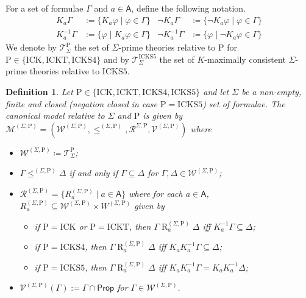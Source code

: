 \documentclass{myifcolog}
\newcommand{\K}{K}
\newcommand\Prop {\mathsf{Prop}}
\newcommand\A{\mathsf{A}}
\newcommand{\agi}{a}
\newcommand{\fw}{\mathcal{M}}
\newcommand{\Rel}{\mathrel{R}}
\newcommand{\W}{\mathcal{W}}
\newcommand{\rel}{\mathcal{R}}
\newcommand{\V}{\mathcal{V}}
\newcommand{\hick}{\mathrm{ICK}}
\newcommand{\hickt}{\mathrm{ICKT}}
\newcommand{\hicks}{\mathrm{ICKS4}}
\newcommand{\hickss}{\mathrm{ICKS5}}
\newcommand{\hickp}{\mathrm{P}}
\newtheorem{definition}[theorem]{Definition}
\numberwithin{theorem}{section}
\begin{document}
For a set of formulae $\Gamma$ and $\agi \in \A$, define the following notation.
\begin{align*}
        \K_\agi \Gamma & := \{ \K_\agi \varphi \mid \varphi \in \Gamma \} &
         \neg \K_\agi \Gamma & \coloneqq \{\neg \K_\agi \varphi \mid \varphi \in \Gamma\} \\
        \K_\agi^{-1} \Gamma & := \{\varphi \mid \K_\agi \varphi \in \Gamma\} &
         \neg \K_\agi^{-1} \Gamma & \coloneqq \{\varphi \mid \neg \K_\agi \varphi \in \Gamma\}
\end{align*}
We denote by $\mathcal{T}_\Sigma^\mathrm{P}$ the set of $\Sigma$-prime theories relative to $\mathrm{P}$ for $\hickp \in \{\hick, \hickt, \hicks\}$ and by $\mathcal{T}_\Sigma^\hickss$ the set of $\K$-maximally consistent $\Sigma$-prime theories relative to $\hickss$.

\begin{definition}
    Let $\hickp \in \{\hick, \hickt, \hicks, \hickss\}$ and let $\Sigma$ be a non-empty, finite and closed (negation closed in case $\hickp = \hickss$) set of formulae. The \emph{canonical model} relative to $\Sigma$ and $\hickp$ is given by $\fw^{(\Sigma, \mathrm{P})} = (\W^{(\Sigma,\mathrm{P})}, \leq^{(\Sigma,\mathrm{P})}, \rel^{\Sigma, \hickp}, \V^{(\Sigma,\mathrm{P})})$ where
    \begin{itemize}
        \item $\W^{(\Sigma, \mathrm{P})} \coloneqq \mathcal{T}_\Sigma^\hickp$;
        \item $\Gamma \leq^{(\Sigma, \mathrm{P})} \Delta$ if and only if $\Gamma \subseteq \Delta$ for $\Gamma, \Delta \in \W^{(\Sigma, \mathrm{P})}$;
        \item $\rel^{(\Sigma, \hickp)} = \{R_\agi^{(\Sigma, \hickp)} \mid \agi \in \A\}$ where for each $\agi \in \A$, $R_\agi^{(\Sigma, \mathrm{P})} \subseteq \W^{(\Sigma, \mathrm{P})} \times W^{(\Sigma, \mathrm{P})}$ given by
        \begin{itemize}
            \item if $\hickp = \hick$ or $\hickp = \hickt$, then $\Gamma \Rel_\agi^{(\Sigma, \mathrm{P})} \Delta$ iff $\K_\agi^{-1} \Gamma \subseteq \Delta$;
            \item if $\hickp = \hicks$, then $\Gamma \Rel_\agi^{(\Sigma, \mathrm{P})} \Delta$ iff $\K_\agi \K_\agi^{-1} \Gamma \subseteq \Delta$;
            \item if $\hickp = \hickss$, then $\Gamma \Rel_\agi^{(\Sigma, \mathrm{P})} \Delta$ iff $\K_\agi \K_\agi^{-1} \Gamma = \K_\agi \K_\agi^{-1} \Delta$;
        \end{itemize}
        \item  $\V^{(\Sigma, \mathrm{P})}(\Gamma) := \Gamma \cap \Prop$ for $\Gamma \in \W^{(\Sigma, \mathrm{P})}$.
    \end{itemize}
\end{definition}
\end{document}
